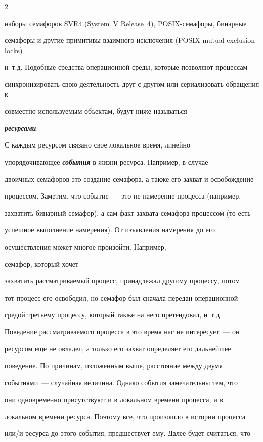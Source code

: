 \begin{multicols}{2}
{набо\-ры семафоров SVR4 (System~V Release~4), POSIX-се\-ма\-фо\-ры, бинарные 

семафоры и другие примитивы взаимного исключения (POSIX mutual exclusion locks) 

и~т.д. Подобные средства операционной среды, которые позволяют процессам 

синхронизировать свою деятельность друг с другом или сериализовать обращения к 

совместно ис\-поль\-зу\-емым объектам,  будут ниже  называться 

{\bfseries\textit{ресурсами}}.



С каждым ресурсом связано свое локальное время, линейно

упорядочивающее {\bfseries\textit{события}} в жизни ресурса. Например, в случае

двоичных семафоров это создание семафора, а также его захват и освобождение

процессом. Заметим, что событие~--- это не намерение процесса (например,

захватить бинарный семафор), а сам факт захвата семафора процессом (то есть

успешное выполнение намерения). От изъявления намерения до его

осуществления может многое произойти. Например,

 семафор, который хочет

захватить рассматриваемый процесс, принадлежал другому процессу, потом

тот процесс его освободил, но семафор был сначала передан операционной

средой третьему процессу, который также на него претендовал, и~т.д.

Поведение рассматриваемого процесса в это время нас не интересует~--- он

ресурсом еще не овладел, а только его захват определяет его дальнейшее

поведение. По причинам,  изложенным выше, расстояние между двумя

событиями~--- случайная величина. Однако события замечательны тем, что

они одновременно присутствуют и в локальном времени процесса, и в

локальном времени ресурса. Поэтому все, что произошло в истории процесса

или/и ресурса до этого события, предшествует ему. Далее  будет считаться, что

}
\end{multicols}
